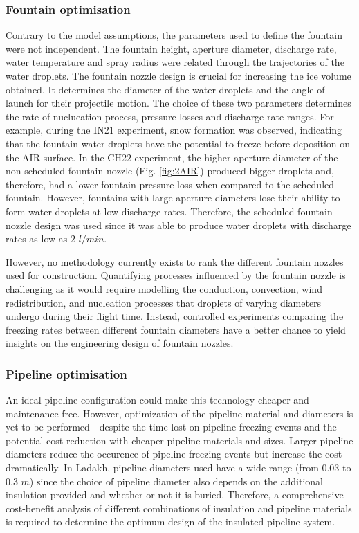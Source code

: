 \documentclass[tc, manuscript]{copernicus}
\begin{document}
\subsubsection{Fountain optimisation}

Contrary to the model assumptions, the parameters used to define the fountain were not independent. The fountain
height, aperture diameter, discharge rate, water temperature and spray radius were related through the
trajectories of the water droplets. The fountain nozzle design is crucial for increasing the ice volume
obtained. It determines the diameter of the water droplets and the angle of launch for their projectile motion.
The choice of these two parameters determines the rate of nuclueation process, pressure losses and discharge
rate ranges. For example, during the IN21 experiment, snow formation was observed, indicating that the fountain
water droplets have the potential to freeze before deposition on the AIR surface. In the CH22 experiment, the
higher aperture diameter of the non-scheduled fountain nozzle (Fig. \ref{fig:2AIR}) produced bigger droplets
and, therefore, had a lower fountain pressure loss when compared to the scheduled fountain. However, fountains
with large aperture diameters lose their ability to form water droplets at low discharge rates. Therefore, the
scheduled fountain nozzle design was used since it was able to produce water droplets with discharge rates as
low as 2 $l/min$.

However, no methodology currently exists to rank the different fountain nozzles used for construction. Quantifying
processes influenced by the fountain nozzle is challenging as it would require modelling the conduction,
convection, wind redistribution, and nucleation processes that droplets of varying diameters undergo during
their flight time. Instead, controlled experiments comparing the freezing rates between different fountain
diameters have a better chance to yield insights on the engineering design of fountain nozzles.

\subsubsection{Pipeline optimisation}

An ideal pipeline configuration could make this technology cheaper and maintenance free. However, optimization
of the pipeline material and diameters is yet to be performed---despite the time lost on pipeline freezing
events and the potential cost reduction with cheaper pipeline materials and sizes. Larger pipeline diameters
reduce the occurence of pipeline freezing events but increase the cost dramatically. In Ladakh, pipeline
diameters used have a wide range (from 0.03 to 0.3 $m$) since the choice of pipeline diameter also depends on
the additional insulation provided and whether or not it is buried. Therefore, a comprehensive cost-benefit
analysis of different combinations of insulation and pipeline materials is required to determine the optimum
design of the insulated pipeline system.  
\end{document}
